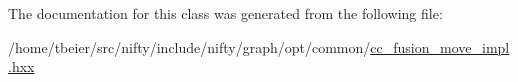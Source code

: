 The documentation for this class was generated from the following file\+:\begin{DoxyCompactItemize}
\item 
/home/tbeier/src/nifty/include/nifty/graph/opt/common/\hyperlink{cc__fusion__move__impl_8hxx}{cc\+\_\+fusion\+\_\+move\+\_\+impl.\+hxx}\end{DoxyCompactItemize}
